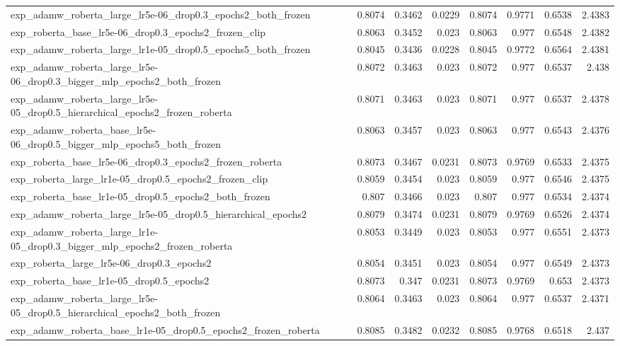 \documentclass[a4paper,oneside,bibliography=totoc]{scrbook}
\begin{document}
\begin{landscape}
\begin{center}
\begin{longtable}{p{4cm} *{7}{r}}
        exp\_adamw\_roberta\_large\_lr5e-06\_drop0.3\_epochs2\_both\_frozen & 0.8074 & 0.3462 & 0.0229 & 0.8074 & 0.9771 & 0.6538 & 2.4383 \\ 
        exp\_roberta\_base\_lr5e-06\_drop0.3\_epochs2\_frozen\_clip & 0.8063 & 0.3452 & 0.023 & 0.8063 & 0.977 & 0.6548 & 2.4382 \\ 
        exp\_adamw\_roberta\_large\_lr1e-05\_drop0.5\_epochs5\_both\_frozen & 0.8045 & 0.3436 & 0.0228 & 0.8045 & 0.9772 & 0.6564 & 2.4381 \\ 
        exp\_adamw\_roberta\_large\_lr5e-06\_drop0.3\_bigger\_mlp\_epochs2\_both\_frozen & 0.8072 & 0.3463 & 0.023 & 0.8072 & 0.977 & 0.6537 & 2.438 \\ 
        exp\_adamw\_roberta\_large\_lr5e-05\_drop0.5\_hierarchical\_epochs2\_frozen\_roberta & 0.8071 & 0.3463 & 0.023 & 0.8071 & 0.977 & 0.6537 & 2.4378 \\ 
        exp\_adamw\_roberta\_base\_lr5e-06\_drop0.5\_bigger\_mlp\_epochs5\_both\_frozen & 0.8063 & 0.3457 & 0.023 & 0.8063 & 0.977 & 0.6543 & 2.4376 \\ 
        exp\_roberta\_base\_lr5e-06\_drop0.3\_epochs2\_frozen\_roberta & 0.8073 & 0.3467 & 0.0231 & 0.8073 & 0.9769 & 0.6533 & 2.4375 \\ 
        exp\_roberta\_large\_lr1e-05\_drop0.5\_epochs2\_frozen\_clip & 0.8059 & 0.3454 & 0.023 & 0.8059 & 0.977 & 0.6546 & 2.4375 \\ 
        exp\_roberta\_base\_lr1e-05\_drop0.5\_epochs2\_both\_frozen & 0.807 & 0.3466 & 0.023 & 0.807 & 0.977 & 0.6534 & 2.4374 \\ 
        exp\_adamw\_roberta\_large\_lr5e-05\_drop0.5\_hierarchical\_epochs2 & 0.8079 & 0.3474 & 0.0231 & 0.8079 & 0.9769 & 0.6526 & 2.4374 \\ 
        exp\_adamw\_roberta\_large\_lr1e-05\_drop0.3\_bigger\_mlp\_epochs2\_frozen\_roberta & 0.8053 & 0.3449 & 0.023 & 0.8053 & 0.977 & 0.6551 & 2.4373 \\ 
        exp\_roberta\_large\_lr5e-06\_drop0.3\_epochs2 & 0.8054 & 0.3451 & 0.023 & 0.8054 & 0.977 & 0.6549 & 2.4373 \\ 
        exp\_roberta\_base\_lr1e-05\_drop0.5\_epochs2 & 0.8073 & 0.347 & 0.0231 & 0.8073 & 0.9769 & 0.653 & 2.4373 \\ 
        exp\_adamw\_roberta\_large\_lr5e-05\_drop0.5\_hierarchical\_epochs2\_both\_frozen & 0.8064 & 0.3463 & 0.023 & 0.8064 & 0.977 & 0.6537 & 2.4371 \\ 
        exp\_adamw\_roberta\_base\_lr1e-05\_drop0.5\_epochs2\_frozen\_roberta & 0.8085 & 0.3482 & 0.0232 & 0.8085 & 0.9768 & 0.6518 & 2.437 \\ 

\end{longtable}
\end{center}
\end{landscape}
\end{document}
